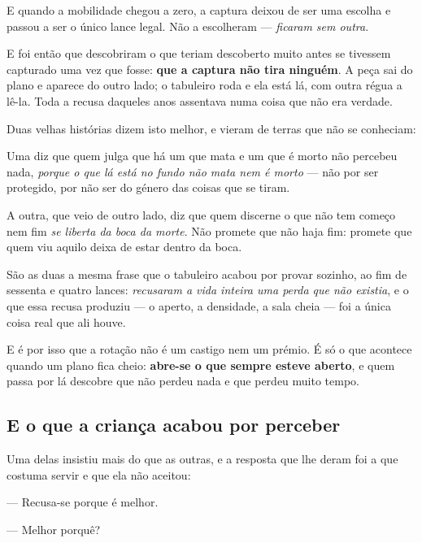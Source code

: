 \documentclass[livro.tex]{subfiles}
\begin{document}
E quando a mobilidade chegou a zero, a captura deixou de ser uma escolha e passou a ser o único
lance legal. Não a escolheram --- \emph{ficaram sem outra}.

\medskip

E foi então que descobriram o que teriam descoberto muito antes se tivessem capturado uma vez que
fosse: \textbf{que a captura não tira ninguém}. A peça sai do plano e aparece do outro lado; o
tabuleiro roda e ela está lá, com outra régua a lê-la. Toda a recusa daqueles anos assentava numa
coisa que não era verdade.

\medskip

Duas velhas histórias dizem isto melhor, e vieram de terras que não se conheciam:

\medskip

Uma diz que quem julga que há um que mata e um que é morto não percebeu nada, \emph{porque o que
lá está no fundo não mata nem é morto} --- não por ser protegido, por não ser do género das coisas
que se tiram.

\medskip

A outra, que veio de outro lado, diz que quem discerne o que não tem começo nem fim \emph{se
liberta da boca da morte}. Não promete que não haja fim: promete que quem viu aquilo deixa de
estar dentro da boca.

\medskip

São as duas a mesma frase que o tabuleiro acabou por provar sozinho, ao fim de sessenta e quatro
lances: \emph{recusaram a vida inteira uma perda que não existia}, e o que essa recusa produziu ---
o aperto, a densidade, a sala cheia --- foi a única coisa real que ali houve.

\medskip

E é por isso que a rotação não é um castigo nem um prémio. É só o que acontece quando um plano
fica cheio: \textbf{abre-se o que sempre esteve aberto}, e quem passa por lá descobre que não
perdeu nada e que perdeu muito tempo.


\subsection*{E o que a criança acabou por perceber}

Uma delas insistiu mais do que as outras, e a resposta que lhe deram foi a que costuma servir e
que ela não aceitou:

\medskip

--- Recusa-se porque é melhor.

--- Melhor porquê?
\end{document}
